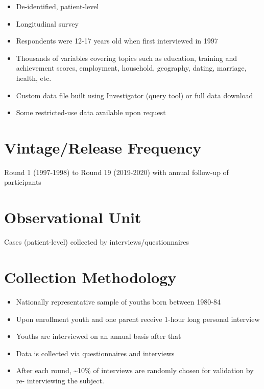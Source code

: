\documentclass[
]{book}
\providecommand{\tightlist}{%
  \setlength{\itemsep}{0pt}\setlength{\parskip}{0pt}}
\begin{document}
\begin{itemize}
\tightlist
\item
  De-identified, patient-level
\item
  Longitudinal survey
\item
  Respondents were 12-17 years old when first interviewed in 1997
\item
  Thousands of variables covering topics such as education, training and achievement scores, employment, household, geography, dating, marriage, health, etc.
\item
  Custom data file built using Investigator (query tool) or full data download
\item
  Some restricted-use data available upon request
\end{itemize}

\hypertarget{vintagerelease-frequency-60}{%
\section{Vintage/Release Frequency}\label{vintagerelease-frequency-60}}

Round 1 (1997-1998) to Round 19 (2019-2020) with annual follow-up of participants

\hypertarget{observational-unit-60}{%
\section{Observational Unit}\label{observational-unit-60}}

Cases (patient-level) collected by interviews/questionnaires

\hypertarget{collection-methodology-60}{%
\section{Collection Methodology}\label{collection-methodology-60}}

\begin{itemize}
\tightlist
\item
  Nationally representative sample of youths born between 1980-84
\item
  Upon enrollment youth and one parent receive 1-hour long personal interview
\item
  Youths are interviewed on an annual basis after that
\item
  Data is collected via questionnaires and interviews
\item
  After each round, \textasciitilde10\% of interviews are randomly chosen for validation by re- interviewing the subject.
\end{itemize}
\end{document}
